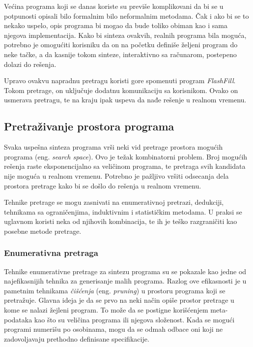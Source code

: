 Većina programa koji se danas koriste su previše komplikovani da bi se u potpunosti opisali bilo formalnim bilo neformalnim metodama. Čak i ako bi se to nekako uspelo, opis programa bi mogao da bude toliko obiman kao i sama njegova implementacija. Kako bi sinteza ovakvih, realnih programa bila moguća, potrebno je omogućiti korisniku da on na početku definiše željeni program do neke tačke, a da kasnije tokom sinteze, interaktivno sa računarom, postepeno dolazi do rešenja.

Upravo ovakvu napradnu pretragu koristi gore spomenuti program \emph{FlashFill}. Tokom pretrage, on uključuje dodatnu komunikaciju sa korisnikom. Ovako on usmerava pretragu, te na kraju ipak uspeva da nađe rešenje u realnom vremenu.


\subsection{Pretraživanje prostora programa}
\label{subsec:ProstorPrograma}

Svaka uspešna sinteza programa vrši neki vid pretrage prostora mo\-gu\-ćih programa (eng. \emph{search space}). Ovo je težak kombinatorni problem. Broj mogućih rešenja raste eksponencijalno sa veličinom programa, te pretraga svih kandidata nije moguća u realnom vremenu. Potrebno je pažljivo vršiti odsecanja dela prostora pretrage kako bi se došlo do rešenja u realnom vremenu.

Tehnike pretrage se mogu zasnivati na enumerativnoj pretrazi, dedukciji, tehnikama sa ograničenjima, induktivnim i statističkim metodama. U praksi se uglavnom koristi neka od njihovih kombinacija, te ih je teško razgraničiti kao posebne metode pretrage.


\subsubsection{Enumerativna pretraga}
\label{subsubsec:Enumerative}

Tehnike enumerativne pretrage za sintezu programa su se pokazale kao jedne od najefikasnijih tehnika za generisanje malih programa. Razlog ove efikasnosti je u pametnim tehnikama \emph{čišćenja} (eng. \emph{pruning}) u prostoru programa koji se pretražuje. Glavna ideja je da se prvo na neki način opiše prostor pretrage u kome se nalazi žejleni program. To može da se postigne korišćenjem meta-podataka kao što su veličina programa ili njegova složenost. Kada se mogući programi numerišu po osobinama, mogu da se odmah odbace oni koji ne zadovoljavaju prethodno definisane specifikacije.


